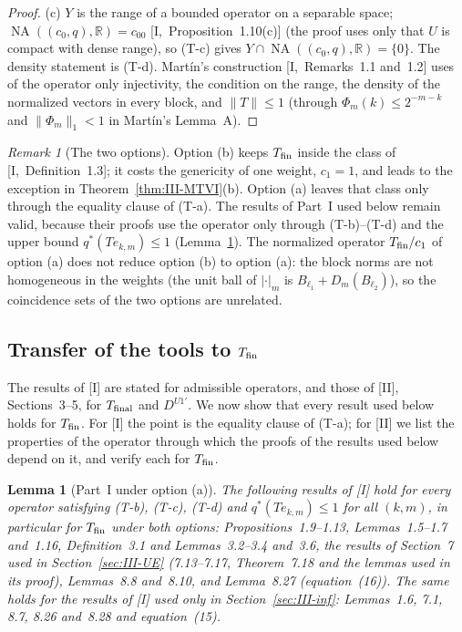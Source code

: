 \documentclass[10pt]{amsart}
\newtheorem{lemma}[theorem]{Lemma}
\theoremstyle{definition}
\theoremstyle{remark}
\newtheorem{remark}[theorem]{Remark}
\newcommand{\NA}{\operatorname{NA}}
\newcommand{\R}{\mathbb R}
\begin{document}
\begin{proof}
(c) $Y$ is the range of a bounded operator on a separable space; $\NA((c_0,q),\R)
=c_{00}$ [I,~Proposition~1.10(c)] (the proof uses only that $U$ is compact with
dense range), so (T-c) gives $Y\cap\NA((c_0,q),\R)=\{0\}$.  The density statement
is (T-d).  Mart\'in's construction [I,~Remarks~1.1 and~1.2] uses of the operator
only injectivity, the condition on the range, the density of the normalized
vectors in every block, and $\|T\|\le1$ (through $\Phi_m(k)\le2^{-m-k}$ and
$\|\Phi_m\|_1<1$ in Mart\'in's Lemma~A).
\end{proof}

\begin{remark}[The two options]\label{rem:III-options}
Option (b) keeps $T_{\rm fin}$ inside the class of [I,~Definition~1.3]; it costs
the genericity of one weight, $c_1=1$, and leads to the exception in
Theorem~\ref{thm:III-MTVI}(b).  Option (a) leaves that class only through the
equality clause of (T-a).  The results of Part~I used below remain valid,
because their proofs use the operator only through (T-b)--(T-d) and the upper
bound $q^*(Te_{k,m})\le1$ (Lemma~\ref{lem:III-partI}).  The normalized operator
$T_{\rm fin}/c_1$ of option (a) does not reduce option (b) to option (a): the
block norms are not homogeneous in the weights (the unit ball of $|\cdot|_m$
is $B_{\ell_1}+D_m(B_{\ell_2})$), so the coincidence sets of the two options are
unrelated.
\end{remark}

\subsection{Transfer of the tools to $T_{\rm fin}$}\label{subsec:III-transfer}

The results of [I] are stated for admissible operators, and those of [II],
Sections~3--5, for $T_{\rm final}$ and $D^{U1'}$.  We now show that every
result used below holds for $T_{\rm fin}$.  For [I] the point is the equality
clause of (T-a); for [II] we list the properties of the operator through which
the proofs of the results used below depend on it, and verify each for
$T_{\rm fin}$.

\begin{lemma}[Part~I under option (a)]\label{lem:III-partI}
The following results of [I] hold for every operator satisfying \textup{(T-b)},
\textup{(T-c)}, \textup{(T-d)} and $q^*(Te_{k,m})\le1$ for all $(k,m)$, in
particular for $T_{\rm fin}$ under both options: Propositions~1.9--1.13,
Lemmas~1.5--1.7 and~1.16, Definition~3.1 and Lemmas~3.2--3.4 and~3.6, the
results of Section~7 used in Section~\ref{sec:III-UE}
\textup{(}7.13--7.17, Theorem~7.18 and the lemmas used in its proof\textup{)},
Lemmas~8.8 and~8.10, and Lemma~8.27 \textup{(}equation~(16)\textup{)}.  The
same holds for the results of [I] used only in Section~\ref{sec:III-inf}:
Lemmas~1.6, 7.1, 8.7, 8.26 and~8.28 and equation~(15).
\end{lemma}
\end{document}
